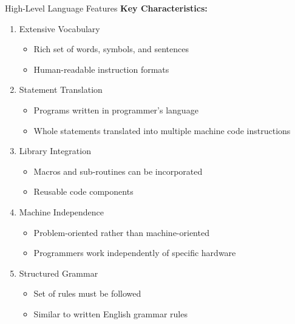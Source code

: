 \documentclass[aspectratio=169]{beamer}
\begin{document}
\begin{frame}{High-Level Language Features}
    \textbf{Key Characteristics:}
    
    \begin{enumerate}
        \item Extensive Vocabulary
        \begin{itemize}
            \item Rich set of words, symbols, and sentences
            \item Human-readable instruction formats
        \end{itemize}
        
        \item Statement Translation
        \begin{itemize}
            \item Programs written in programmer's language
            \item Whole statements translated into multiple machine code instructions
        \end{itemize}
        
        \item Library Integration
        \begin{itemize}
            \item Macros and sub-routines can be incorporated
            \item Reusable code components
        \end{itemize}
        
        \item Machine Independence
        \begin{itemize}
            \item Problem-oriented rather than machine-oriented
            \item Programmers work independently of specific hardware
        \end{itemize}
        
        \item Structured Grammar
        \begin{itemize}
            \item Set of rules must be followed
            \item Similar to written English grammar rules
        \end{itemize}
    \end{enumerate}
\end{frame}
\end{document}
